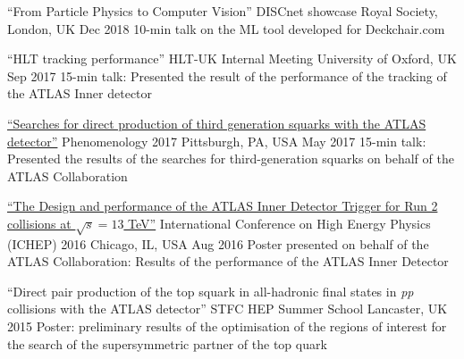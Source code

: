 \begin{cventries}
  \cventry
    {``From Particle Physics to Computer Vision''}
    {DISCnet showcase}
    {Royal Society, London, UK}
    {Dec 2018}
    {10-min talk on the ML tool developed for Deckchair.com}

  \cventry
    {``HLT tracking performance''}
    {HLT-UK Internal Meeting}
    {University of Oxford, UK}
    {Sep 2017}
    {15-min talk: Presented the result of the performance of the tracking of the ATLAS Inner detector}

  \cventry
    {
    \href{http://cds.cern.ch/record/2263055/files/ATL-PHYS-SLIDE-2017-220.pdf}{``Searches for direct production of third generation squarks with the ATLAS detector''}
    }
    {Phenomenology 2017}
    {Pittsburgh, PA, USA}
    {May 2017}
    {15-min talk: Presented the results of the searches for third-generation squarks on behalf of the ATLAS Collaboration}

  \cventry
    {
    \href{https://indico.cern.ch/event/432527/contributions/1071672/attachments/1317672/1974610/FMiano-IDTrigger-ICHEP.pdf}
    {``The Design and performance of the ATLAS Inner Detector Trigger for Run 2 collisions at $\sqrt{s} = 13$ TeV''}
    }
    {International Conference on High Energy Physics (ICHEP) 2016}
    {Chicago, IL, USA}
    {Aug 2016}
    {Poster presented on behalf of the ATLAS Collaboration: Results of the performance of the ATLAS Inner Detector}

  \cventry
    {``Direct pair production of the top squark in all-hadronic final states in \emph{pp} collisions with the ATLAS detector''}
    {STFC HEP Summer School}
    {Lancaster, UK}
    {2015}
    {Poster: preliminary results of the optimisation of the regions of interest for the search of the supersymmetric partner of the top quark}
\end{cventries}